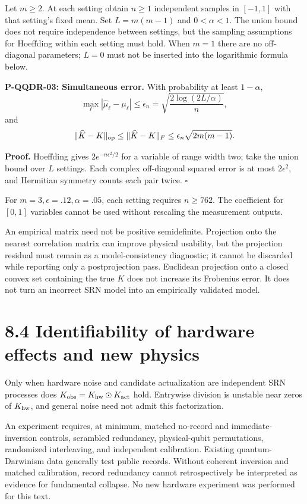 \documentclass[
  11pt,
  oneside]{book}
\begin{document}
Let \(m\ge2\). At each setting obtain \(n\ge1\) independent samples in
\([-1,1]\) with that setting's fixed mean. Set \(L=m(m-1)\) and
\(0<\alpha<1\). The union bound does not require independence between
settings, but the sampling assumptions for Hoeffding within each setting
must hold. When \(m=1\) there are no off-diagonal parameters; \(L=0\)
must not be inserted into the logarithmic formula below.

\label{p-qqdr-03}{}

\textbf{P-QQDR-03: Simultaneous error.} With probability at least
\(1-\alpha\), \[
\max_\ell|\widehat\mu_\ell-\mu_\ell|
\le\epsilon_n=\sqrt{\frac{2\log(2L/\alpha)}n},
\] and \[
\|\widehat K-K\|_{\rm op}\le\|\widehat K-K\|_F
\le\epsilon_n\sqrt{2m(m-1)}.
\]

\textbf{Proof.} Hoeffding gives \(2e^{-n\epsilon^2/2}\) for a variable
of range width two; take the union bound over \(L\) settings. Each
complex off-diagonal squared error is at most \(2\epsilon^2\), and
Hermitian symmetry counts each pair twice. \(\square\)

For \(m=3,\epsilon=.12,\alpha=.05\), each setting requires \(n\ge762\).
The coefficient for \([0,1]\) variables cannot be used without rescaling
the measurement outputs.

An empirical matrix need not be positive semidefinite. Projection onto
the nearest correlation matrix can improve physical usability, but the
projection residual must remain as a model-consistency diagnostic; it
cannot be discarded while reporting only a postprojection pass.
Euclidean projection onto a closed convex set containing the true \(K\)
does not increase its Frobenius error. It does not turn an incorrect SRN
model into an empirically validated model.

\section{8.4 Identifiability of hardware effects and new physics}

Only when hardware noise and candidate actualization are independent SRN
processes does \(K_{\rm obs}=K_{\rm hw}\odot K_{\rm act}\) hold.
Entrywise division is unstable near zeros of \(K_{\rm hw}\), and general
noise need not admit this factorization.

An experiment requires, at minimum, matched no-record and
immediate-inversion controls, scrambled redundancy, physical-qubit
permutations, randomized interleaving, and independent calibration.
Existing quantum-Darwinism data generally test public records. Without
coherent inversion and matched calibration, record redundancy cannot
retrospectively be interpreted as evidence for fundamental collapse. No
new hardware experiment was performed for this text.
\end{document}
